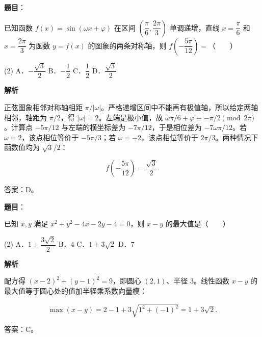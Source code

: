 \begin{answer}

\textbf{题目}：

已知函数 $f(x)=\sin(\omega x+\varphi)$ 在区间 $\left(\dfrac\pi6,\dfrac{2\pi}3\right)$ 单调递增，直线 $x=\dfrac\pi6$ 和 $x=\dfrac{2\pi}3$ 为函数 $y=f(x)$ 的图象的两条对称轴，则 $f\left(-\dfrac{5\pi}{12}\right)=$\mbox{（　　）}

\begin{gkopts}(2)
\task A．$-\dfrac{\sqrt3}{2}$
\task B．$-\dfrac12$
\task C．$\dfrac12$
\task D．$\dfrac{\sqrt3}{2}$
\end{gkopts}

\textbf{解析}

正弦图象相邻对称轴相距 $\pi/|\omega|$。严格递增区间中不能再有极值轴，所以给定两轴相邻，轴距为 $\pi/2$，得 $|\omega|=2$。左端是极小值，故 $\omega\pi/6+\varphi\equiv-\pi/2\pmod{2\pi}$。计算点 $-5\pi/12$ 与左端的横坐标差为 $-7\pi/12$，于是相位差为 $-7\omega\pi/12$。若 $\omega=2$，该点相位等价于 $-5\pi/3$；若 $\omega=-2$，该点相位等价于 $2\pi/3$。两种情况下函数值均为 $\sqrt3/2$：

\nopagebreak[4]
\[
f\left(-\frac{5\pi}{12}\right)=\frac{\sqrt3}{2}.
\]

答案：D。


\end{answer}
\begin{answer}

\textbf{题目}：

已知 $x,y$ 满足 $x^2+y^2-4x-2y-4=0$，则 $x-y$ 的最大值是\mbox{（　　）}

\begin{gkopts}(2)
\task A．$1+\dfrac{3\sqrt2}{2}$
\task B．$4$
\task C．$1+3\sqrt2$
\task D．$7$
\end{gkopts}

\textbf{解析}

配方得 $(x-2)^2+(y-1)^2=9$，即圆心 $(2,1)$、半径 $3$。线性函数 $x-y$ 的最大值等于圆心处的值加半径乘系数向量模：

\nopagebreak[4]
\[
\max(x-y)=2-1+3\sqrt{1^2+(-1)^2}=1+3\sqrt2.
\]

答案：C。


\end{answer}
